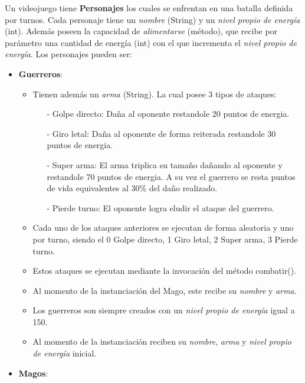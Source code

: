 \documentclass{exam}
\begin{document}
       \item Un videojuego tiene \textbf{Personajes} los cuales se enfrentan en una batalla definida por turnos. Cada personaje tiene un \emph{nombre} (String) y un
       \emph{nivel propio de energ\'ia} (int). Adem\'as poseen la capacidad de  \emph{alimentarse} (m\'etodo), que recibe por par\'ametro
       una cantidad de energ\'ia (int) con el que incrementa el \emph{nivel propio de energ\'ia}. Los personajes pueden ser:
       \begin{itemize}
         \item \textbf{Guerreros}:
         \begin{itemize}
           \item Tienen adem\'as un \emph{arma} (String). La cual posee 3 tipos de ataques:
           \begin{enumerate}
             \item[-] Golpe directo: Da\~na al oponente restandole 20 puntos de energia.
             \item[-] Giro letal: Da\~na al oponente de forma reiterada restandole 30 puntos de energia.
             \item[-] Super arma: El arma triplica su tama\~no da\~nando al oponente y restandole 70 puntos de energia. A su vez el guerrero se resta puntos de vida equivalentes al 30\% del da\~no realizado.
             \item[-] Pierde turno: El oponente logra eludir el ataque del guerrero.
           \end{enumerate}
           \item Cada uno de los ataques anteriores se ejecutan  de forma aleatoria y uno por turno, siendo el 0 Golpe directo, 1 Giro letal, 2 Super arma, 3 Pierde turno.
           \item Estos ataques se ejecutan mediante la invocaci\'on del m\'etodo combatir().
           \item Al momento de la instanciaci\'on del Mago, este recibe su  \emph{nombre} y \emph{arma}.
           \item Los guerreros son siempre creados con un \emph{nivel propio de energ\'ia} igual a 150.
          \item Al momento de la instanciaci\'on reciben su \emph{nombre},  \emph{arma} y \emph{nivel propio de energ\'ia} inicial.
        \end{itemize}

         \item \textbf{Magos}:


\end{itemize}
\end{document}
